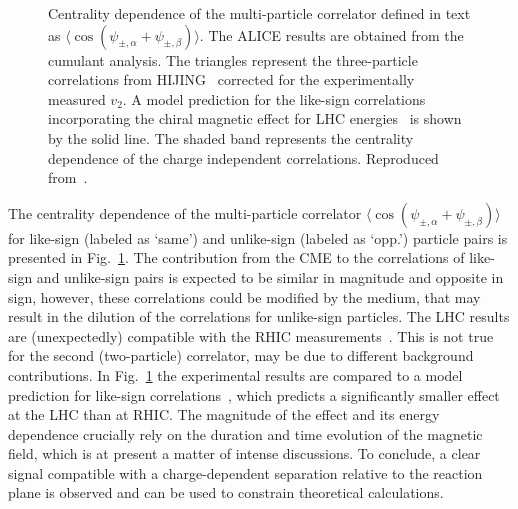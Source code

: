 \begin{figure}
\centering
\caption{Centrality dependence of the multi-particle correlator defined in text as $\langle \cos{(\psi_{\pm,\alpha} + \psi_{\pm,\beta})} \rangle$. The ALICE results are obtained from the cumulant analysis.  The triangles represent the three-particle correlations from HIJING~\cite{Wang:1991hta} corrected for the experimentally measured $v_2$. A model prediction for the like-sign correlations incorporating the chiral magnetic effect for LHC energies~\cite{Toneev:2010xt} is shown by the solid line. The shaded band represents the centrality dependence of the charge independent correlations. Reproduced from~\cite{Abelev:2012pa}.}
\label{figks:ChSep}
\end{figure}


The centrality dependence of the multi-particle correlator $\langle \cos{(\psi_{\pm,\alpha} + \psi_{\pm,\beta})} \rangle$ for like-sign (labeled as `same') and unlike-sign (labeled as `opp.') particle pairs is presented in Fig.~\ref{figks:ChSep}. The contribution from the CME to the correlations of like-sign and unlike-sign pairs is expected to be similar in magnitude and opposite in sign, however, these correlations could be modified by the medium, that may result in the dilution of the correlations for unlike-sign particles. The LHC results are (unexpectedly) compatible with the RHIC measurements~\cite{Abelev:2009ac}. This is not true for the second (two-particle) correlator, may be due to different background contributions. In Fig.~\ref{figks:ChSep} the experimental results are compared to a model prediction for like-sign correlations~\cite{Toneev:2010xt}, which predicts a significantly smaller effect at the LHC than at RHIC. The magnitude of the effect and its energy dependence crucially rely on the duration and time evolution of the magnetic field, which is at present a matter of intense discussions. To conclude, a clear signal compatible with a charge-dependent separation relative to the reaction plane is observed and can be used to constrain theoretical calculations.
